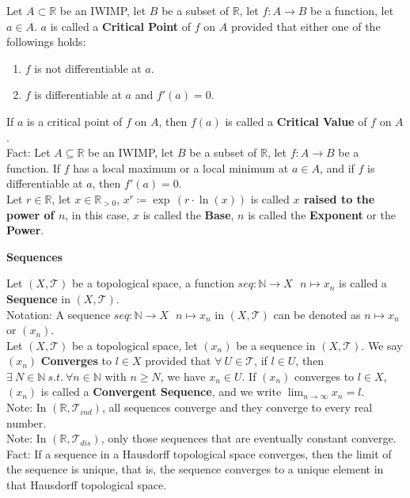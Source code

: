 \documentclass[11pt]{article}
\newcommand{\R}{\mathbb{R}}
\newcommand{\N}{\mathbb{N}}
\newcommand{\T}{\mathcal{T}}
\newcommand{\note}{\color{gray}Note: \color{black}}
\newcommand{\notation}{\color{gray}Notation: \color{black}}
\newcommand{\fact}{\color{gray}Fact: \color{black}}
\begin{document}
		\noindent Let $A \subset \R$ be an IWIMP, let $B$ be a subset of $\R$, let $f:A \to B$ be a function, let $a \in A$. $a$ is called a \textbf{Critical Point} of $f$ on $A$ provided that either one of the followings holds:
		\begin{enumerate}[topsep=3pt,itemsep=-1ex,partopsep=1ex,parsep=1ex]
			\item $f$ is not differentiable at $a$.
			\item $f$ is differentiable at $a$ and $f'(a)=0$.
		\end{enumerate}
		If $a$ is a critical point of $f$ on $A$, then $f(a)$ is called a \textbf{Critical Value} of $f$ on $A$.\\
		\fact Let $A \subseteq \R$ be an IWIMP, let $B$ be a subset of $\R$, let $f:A \to B$ be a function. If $f$ has a local maximum or a local minimum at $a \in A$, and if $f$ is differentiable at $a$, then $f'(a)=0$.\\
		
		\noindent Let $r \in \R$, let $x \in \R_{>0}$, $x^r \coloneqq \exp \,(r \cdot \ln(x))$ is called \textbf{$x$ raised to the power of $n$}, in this case, $x$ is called the \textbf{Base}, $n$ is called the \textbf{Exponent} or the \textbf{Power}.\\
		
		
	\clearpage
	
	
	
	
	
	
	\LARGE \color{red}
		\noindent \textbf{Sequences}\\
	\normalsize	\color{black}	
	
		\noindent Let $(X,\T)$ be a topological space, a function $seq: \N \to X \ \ \ n \mapsto x_n$ is called a \textbf{Sequence} in $(X,\T)$.\\
		\notation A sequence $seq: \N \to X \ \ \ n \mapsto x_n$ in $(X,\T)$ can be denoted as $n \mapsto x_n$ or $(x_n)$.\\
		
		\noindent Let $(X,\T)$ be a topological space, let $(x_n)$ be a sequence in $(X,\T)$. We say $(x_n)$ \textbf{Converges} to $l \in X$ provided that $\forall \ U \in \T$, if $l \in U$, then $\exists \ N \in \N \ s.t. \ \forall n \in \N$ with $n\geq N$, we have $x_n \in U$. If $(x_n)$ converges to $l \in X$, $(x_n)$ is called a \textbf{Convergent Sequence}, and we write $\lim_{n \to \infty} x_n = l$.\\
		\note In $(\R,\T_{ind})$, all sequences converge and they converge to every real number.\\
		\note In $(\R,\T_{dis})$, only those sequences that are eventually constant converge.\\
		\fact If a sequence in a Hausdorff topological space converges, then the limit of the sequence is unique, that is, the sequence converges to a unique element in that Hausdorff topological space.\\
		
\end{document}
